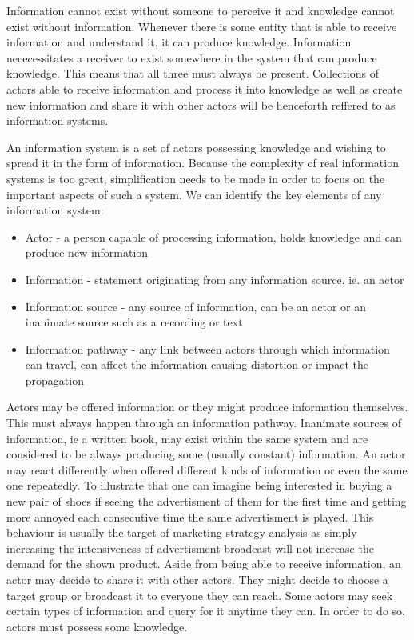 Information cannot exist without someone to perceive it and knowledge cannot exist without information.
Whenever there is some entity that is able to receive information and understand it, it can produce knowledge.
Information nececessitates a receiver to exist somewhere in the system that can produce knowledge.
This means that all three must always be present.
Collections of actors able to receive information and process it into knowledge as well as create new information and share it with other actors will be henceforth reffered to as information systems.

An information system is a set of actors possessing knowledge and wishing to spread it in the form of information.
Because the complexity of real information systems is too great, simplification needs to be made in order to focus on the important aspects of such a system.
We can identify the key elements of any information system:
\begin{itemize}
    \item Actor - a person capable of processing information, holds knowledge and can produce new information
    \item Information - statement originating from any information source, ie. an actor
    \item Information source - any source of information, can be an actor or an inanimate source such as a recording or text
    \item Information pathway - any link between actors through which information can travel, can affect the information causing distortion or impact the propagation
\end{itemize}
Actors may be offered information or they might produce information themselves.
This must always happen through an information pathway.
Inanimate sources of information, ie a written book, may exist within the same system and are considered to be always producing some (usually constant) information.
An actor may react differently when offered different kinds of information or even the same one repeatedly.
To illustrate that one can imagine being interested in buying a new pair of shoes if seeing the advertisment of them for the first time and getting more annoyed each consecutive time the same advertisment is played.
This behaviour is usually the target of marketing strategy analysis as simply increasing the intensiveness of advertisment broadcast will not increase the demand for the shown product.
Aside from being able to receive information, an actor may decide to share it with other actors.
They might decide to choose a target group or broadcast it to everyone they can reach.
Some actors may seek certain types of information and query for it anytime they can.
In order to do so, actors must possess some knowledge.

